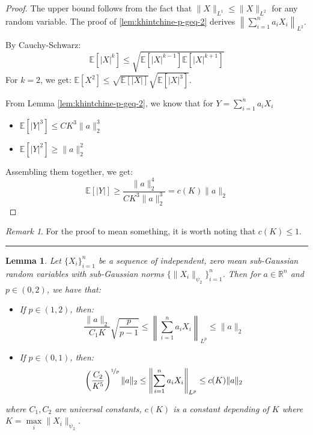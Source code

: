 \documentclass{article}
\newtheorem{lemma}{Lemma}[subsection]
\theoremstyle{remark}
\newtheorem*{remark}{Remark}
\newcommand{\comprule}{\textcolor[RGB]{220,220,220}{\rule{\linewidth}{0.2pt}}}
\newcommand{\real}{\mathbb{R}}
\newcommand{\Exp}{\mathbb{E}}
\begin{document}
\begin{proof}
The upper bound follows from the fact that \(\|X\|_{L^{1}} \leq \|X\|_{L^{2}}\) for any random variable. The proof of \ref{lem:khintchine-p-geq-2} derives \(\left\|\sum\limits_{i=1}^{n} a_{i}X_{i}\right\|_{L^{2}}\).

By Cauchy-Schwarz:
\begin{equation*}
\Exp[|X|^{k}] \leq \sqrt{\Exp[|X|^{k - 1}]\Exp[|X|^{k + 1}]}
\end{equation*}
For \(k = 2\), we get: \(\Exp[X^{2}] \leq \sqrt{\Exp[|X|]} \sqrt{\Exp[|X|^{3}]}\).

From Lemma \ref{lem:khintchine-p-geq-2}, we know that for \(Y = \sum\limits_{i=1}^{n}a_{i}X_{i}\)
\begin{itemize}
\item \(\Exp[|Y|^{3}] \leq CK^{3}\|a\|_{2}^{3}\)
\item \(\Exp[|Y|^{2}] \geq \|a\|_{2}^{2}\)
\end{itemize}

Assembling them together, we get:
\begin{equation*}
\Exp[|Y|] \geq \frac{\|a\|_{2}^{4}}{CK^{3}\|a\|_{2}^{3}} = c(K)\|a\|_{2}
\end{equation*}
\end{proof}

\begin{remark}
For the proof to mean something, it is worth noting that \(c(K) \leq 1\).
\end{remark}

\comprule

\begin{lemma}
Let \(\{X_{i}\}_{i=1}^{n}\) be a sequence of independent, zero mean sub-Gaussian random variables with sub-Gaussian norms \(\{\|X_{i}\|_{\psi_{2}}\}_{i=1}^{n}\). Then for \(a \in \real^{n}\) and \(p \in (0, 2)\), we have that:
\begin{itemize}
\item If \(p \in (1, 2)\), then:
\begin{equation*}
\frac{\|a\|_{2}}{C_{1}K}\sqrt{\frac{p}{p - 1}} \leq \left\|\sum_{i=1}^{n} a_{i}X_{i}\right\|_{L^{p}} \leq \|a\|_{2}
\end{equation*}

\item If \(p \in (0, 1)\), then:
\begin{equation*}
\left(\frac{C_{2}}{K^{5}}\right)^{\nicefrac{1}{p}}\|a\|_{2} \leq \left\|\sum_{i=1}^{n} a_{i}X_{i}\right\|_{L^{p}} \leq c(K)\|a\|_{2}
\end{equation*}
\end{itemize}
where \(C_{1}, C_{2}\) are universal constants, \(c(K)\) is a constant depending of \(K\) where \(K = \max\limits_{i} \|X_{i}\|_{\psi_{2}}\).
\end{lemma}
\end{document}
